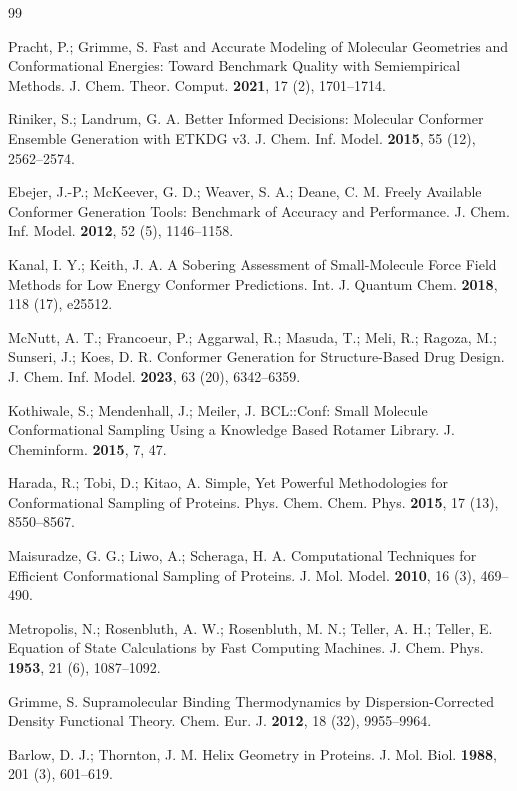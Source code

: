 \documentclass[12pt]{article}
\begin{document}
\begin{thebibliography}{99}

 Pracht, P.; Grimme, S. Fast and Accurate Modeling of Molecular Geometries and Conformational Energies: Toward Benchmark Quality with Semiempirical Methods. J. Chem. Theor. Comput. \textbf{2021}, 17 (2), 1701--1714.

 Riniker, S.; Landrum, G. A. Better Informed Decisions: Molecular Conformer Ensemble Generation with ETKDG v3. J. Chem. Inf. Model. \textbf{2015}, 55 (12), 2562--2574.

 Ebejer, J.-P.; McKeever, G. D.; Weaver, S. A.; Deane, C. M. Freely Available Conformer Generation Tools: Benchmark of Accuracy and Performance. J. Chem. Inf. Model. \textbf{2012}, 52 (5), 1146--1158.

 Kanal, I. Y.; Keith, J. A. A Sobering Assessment of Small-Molecule Force Field Methods for Low Energy Conformer Predictions. Int. J. Quantum Chem. \textbf{2018}, 118 (17), e25512.

 McNutt, A. T.; Francoeur, P.; Aggarwal, R.; Masuda, T.; Meli, R.; Ragoza, M.; Sunseri, J.; Koes, D. R. Conformer Generation for Structure-Based Drug Design. J. Chem. Inf. Model. \textbf{2023}, 63 (20), 6342--6359.

 Kothiwale, S.; Mendenhall, J.; Meiler, J. BCL::Conf: Small Molecule Conformational Sampling Using a Knowledge Based Rotamer Library. J. Cheminform. \textbf{2015}, 7, 47.

 Harada, R.; Tobi, D.; Kitao, A. Simple, Yet Powerful Methodologies for Conformational Sampling of Proteins. Phys. Chem. Chem. Phys. \textbf{2015}, 17 (13), 8550--8567.

 Maisuradze, G. G.; Liwo, A.; Scheraga, H. A. Computational Techniques for Efficient Conformational Sampling of Proteins. J. Mol. Model. \textbf{2010}, 16 (3), 469--490.

 Metropolis, N.; Rosenbluth, A. W.; Rosenbluth, M. N.; Teller, A. H.; Teller, E. Equation of State Calculations by Fast Computing Machines. J. Chem. Phys. \textbf{1953}, 21 (6), 1087--1092.

 Grimme, S. Supramolecular Binding Thermodynamics by Dispersion-Corrected Density Functional Theory. Chem. Eur. J. \textbf{2012}, 18 (32), 9955--9964.

 Barlow, D. J.; Thornton, J. M. Helix Geometry in Proteins. J. Mol. Biol. \textbf{1988}, 201 (3), 601--619.


\end{thebibliography}
\end{document}
